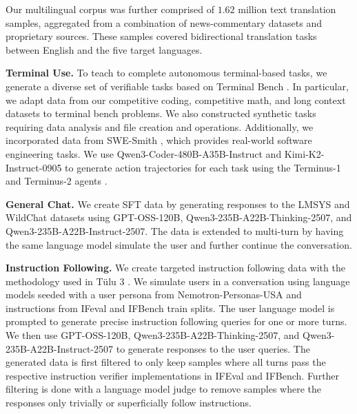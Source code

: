 Our multilingual corpus was further comprised of $1.62$ million text translation samples, aggregated from a combination of news-commentary datasets and proprietary sources. These samples covered bidirectional translation tasks between English and the five target languages.


\textbf{Terminal Use.} To teach \ourmodel to complete autonomous terminal-based tasks, we generate a diverse set of verifiable tasks based on Terminal Bench \citep{tbench_2025}. In particular, we adapt data from our competitive coding, competitive math, and long context datasets to terminal bench problems. We also constructed synthetic tasks requiring data analysis and file creation and operations. Additionally, we incorporated data from SWE-Smith \citep{swesmith}, which provides real-world software engineering tasks. We use 
Qwen3-Coder-480B-A35B-Instruct \citep{qwen2025qwen25technicalreport} and Kimi-K2-Instruct-0905 \citep{kimiteam2025kimik2openagentic} to generate action trajectories for each task using the Terminus-1 and Terminus-2 agents \citep{tbench_2025}.

\textbf{General Chat.} We create SFT data by generating responses to the LMSYS \citep{zheng2023judging} and WildChat datasets \citep{li2024wildchat} using GPT-OSS-120B, Qwen3-235B-A22B-Thinking-2507, and Qwen3-235B-A22B-Instruct-2507. The data is extended to multi-turn by having the same language model simulate the user and further continue the conversation.

\textbf{Instruction Following.} We create targeted instruction following data with the methodology used in Tülu 3 \citep{lambert2025tulu3pushingfrontiers}. We simulate users in a conversation using language models seeded with a user persona from Nemotron-Personas-USA \citep{nvidia/Nemotron-Personas-USA} and instructions from IFeval \citep{zhou2023instruction} and IFBench \citep{pyatkin2025generalizing} train splits. The user language model is prompted to generate precise instruction following queries for one or more turns. We then use GPT-OSS-120B, Qwen3-235B-A22B-Thinking-2507, and Qwen3-235B-A22B-Instruct-2507 to generate responses to the user queries. The generated data is first filtered to only keep samples where all turns pass the respective instruction verifier implementations in IFEval and IFBench. Further filtering is done with a language model judge to remove samples where the responses only trivially or superficially follow instructions.

